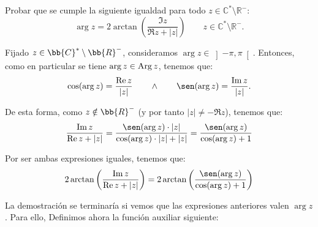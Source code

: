 \begin{ejercicio}
    Probar que se cumple la siguiente igualdad para todo $z \in \mathbb{C}^\ast \setminus \mathbb{R}^-$:
    \[
        \arg z = 2\arctan\left(\dfrac{\Im z}{\Re z + |z|}\right)\qquad z\in \mathbb{C}^\ast \setminus \mathbb{R}^-.
    \]

    Fijado $z\in \bb{C}^*\setminus \bb{R}^-$, consideramos $\arg z\in \left]-\pi,\pi\right[$. Entonces, como en particular se tiene $\arg z\in\operatorname{Arg} z$, tenemos que:
    \begin{equation*}
        \cos (\arg z) = \dfrac{\Re z}{|z|} \qquad \land \qquad \sen(\arg z) = \dfrac{\Im z}{|z|}.
    \end{equation*}
    \begin{comment}
    \begin{equation*}
        \left\{
            \begin{array}{c}
                \cos\theta = \dfrac{\Re z}{|z|} \\ \land \\ \sen\theta = \dfrac{\Im z}{|z|}.
            \end{array}
        \right\}
        \Longleftrightarrow \theta\in \Arg z
    \end{equation*}
    \end{comment}

    De esta forma, como $z\notin \bb{R}^-$ (y por tanto $|z|\neq -\Re z$), tenemos que:
    \begin{align*}
        \dfrac{\Im z}{\Re z + |z|}
        = \dfrac{\sen(\arg z)\cdot |z|}{\cos(\arg z)\cdot |z| + |z|}
        = \dfrac{\sen(\arg z)}{\cos(\arg z) + 1}
    \end{align*}

    Por ser ambas expresiones iguales, tenemos que:
    \begin{equation*}
        2\arctan\left(\dfrac{\Im z}{\Re z + |z|}\right)=2\arctan\left(\dfrac{\sen(\arg z)}{\cos(\arg z) + 1}\right)
    \end{equation*}

    La demostración se terminaría si vemos que las expresiones anteriores valen $\arg z$. Para ello, Definimos ahora la función auxiliar siguiente:
    \Func{f}{\left]-\pi,\pi\right[}{\bb{R}}{\alpha}{\alpha - 2\arctan\left(\dfrac{\sen\alpha}{\cos\alpha + 1}\right)}


\end{ejercicio}
